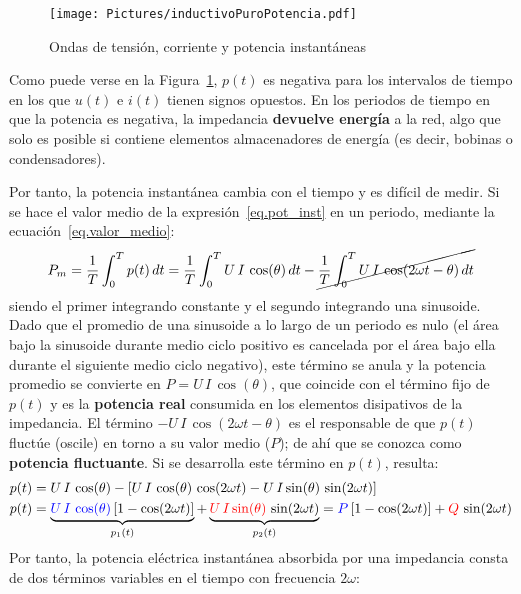 \documentclass[11pt]{book} %
\numberwithin{dummy}{section}
\theoremstyle{ocrenumbox}
\theoremstyle{blacknumex}
\theoremstyle{blacknumbox}
\theoremstyle{ocrenum}
\newlength\esp
\begin{document}
	\begin{figure}[htbp]
		\centering
		\texttt{[image: Pictures/inductivoPuroPotencia.pdf]}
		\caption{Ondas de tensión, corriente y potencia instantáneas}
		\label{fig.inductivoPuroPotencia}
	\end{figure}
	Como puede verse en la Figura~\ref{fig.inductivoPuroPotencia}, $p(t)$ es negativa para los intervalos de tiempo en los que $u(t)$ e $i(t)$ tienen signos opuestos. En los periodos de tiempo en que la potencia es negativa, la impedancia \textbf{devuelve energía} a la red, algo que solo es posible si contiene elementos almacenadores de energía (es decir, bobinas o condensadores). 
	
	Por tanto, la potencia instantánea cambia con el tiempo y es difícil de medir. Si se hace el valor medio de la expresión~\eqref{eq.pot_inst} en un periodo, mediante la ecuación~\eqref{eq.valor_medio}:
	\begin{equation*}
		P_m=\dfrac{1}{T}\int_{0}^{T}p(t)\,dt=\dfrac{1}{T}\int_{0}^{T}U\,I\,\cos(\theta)\,dt-\cancel{\dfrac{1}{T}\int_{0}^{T}U\,I\,\cos(2\omega t-\theta)\,dt}
	\end{equation*}
	siendo el primer integrando constante y el segundo integrando una sinusoide. Dado que el promedio de una sinusoide a lo largo de un periodo es nulo (el área bajo la sinusoide durante medio ciclo positivo es cancelada por el área bajo ella durante el siguiente medio ciclo negativo), este término se anula y la potencia promedio se convierte en $P=U\,I\,\cos(\theta)$, que coincide con el término fijo de $p(t)$ y es la \textbf{potencia real} consumida en los elementos disipativos de la impedancia. El término $-U\,I\,\cos(2\omega t-\theta)$ es el responsable de que $p(t)$ fluctúe (oscile) en torno a su valor medio ($P$); de ahí que se conozca como \textbf{potencia fluctuante}. Si se desarrolla este término en $p(t)$, resulta: 
	\begin{align*}
		p(t)&=U\,I\,\cos(\theta)-\left[ U\,I\,\cos(\theta)\,\cos(2\omega t) - U\,I\sin(\theta)\,\sin(2\omega t)\right]\\
		p(t)&=\underbrace{{\color{blue}U\,I\,\cos(\theta)}\left[1-\cos(2\omega t)\right]}_{p_1(t)} + \underbrace{{\color{red}U\,I\sin(\theta)}\,\sin(2\omega t)}_{p_2(t)}={\color{blue}P}\left[1-\cos(2\omega t)\right] + {\color{red}Q}\,\sin(2\omega t)
	\end{align*}
	Por tanto, la potencia eléctrica instantánea absorbida por una impedancia consta de dos términos variables en el tiempo con frecuencia $2\omega$:
\end{document}
